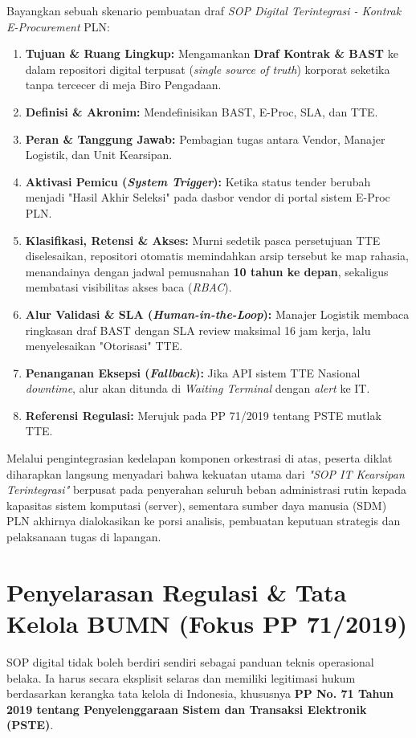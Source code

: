 \documentclass[12pt,a4paper]{report}
\begin{document}
Bayangkan sebuah skenario pembuatan draf \textit{SOP Digital Terintegrasi - Kontrak E-Procurement} PLN:

\begin{enumerate}[leftmargin=*]
    \item \textbf{Tujuan \& Ruang Lingkup:} Mengamankan \textbf{Draf Kontrak \& BAST} ke dalam repositori digital terpusat (\textit{single source of truth}) korporat seketika tanpa tercecer di meja Biro Pengadaan.
    \item \textbf{Definisi \& Akronim:} Mendefinisikan BAST, E-Proc, SLA, dan TTE.
    \item \textbf{Peran \& Tanggung Jawab:} Pembagian tugas antara Vendor, Manajer Logistik, dan Unit Kearsipan.
    \item \textbf{Aktivasi Pemicu (\textit{System Trigger}):} Ketika status tender berubah menjadi "Hasil Akhir Seleksi" pada dasbor vendor di portal sistem E-Proc PLN.
    \item \textbf{Klasifikasi, Retensi \& Akses:} Murni sedetik pasca persetujuan TTE diselesaikan, repositori otomatis memindahkan arsip tersebut ke map rahasia, menandainya dengan jadwal pemusnahan \textbf{10 tahun ke depan}, sekaligus membatasi visibilitas akses baca (\textit{RBAC}).
    \item \textbf{Alur Validasi \& SLA (\textit{Human-in-the-Loop}):} Manajer Logistik membaca ringkasan draf BAST dengan SLA review maksimal 16 jam kerja, lalu menyelesaikan "Otorisasi" TTE.
    \item \textbf{Penanganan Eksepsi (\textit{Fallback}):} Jika API sistem TTE Nasional \textit{downtime}, alur akan ditunda di \textit{Waiting Terminal} dengan \textit{alert} ke IT.
    \item \textbf{Referensi Regulasi:} Merujuk pada PP 71/2019 tentang PSTE mutlak TTE.
\end{enumerate}

Melalui pengintegrasian kedelapan komponen orkestrasi di atas, peserta diklat diharapkan langsung menyadari bahwa kekuatan utama dari \textit{"SOP IT Kearsipan Terintegrasi"} berpusat pada penyerahan seluruh beban administrasi rutin kepada kapasitas sistem komputasi (server), sementara sumber daya manusia (SDM) PLN akhirnya dialokasikan ke porsi analisis, pembuatan keputuan strategis dan pelaksanaan tugas di lapangan.

\section{Penyelarasan Regulasi \& Tata Kelola BUMN (Fokus PP 71/2019)}
SOP digital tidak boleh berdiri sendiri sebagai panduan teknis operasional belaka. Ia harus secara eksplisit selaras dan memiliki legitimasi hukum berdasarkan kerangka tata kelola di Indonesia, khususnya \textbf{PP No. 71 Tahun 2019 tentang Penyelenggaraan Sistem dan Transaksi Elektronik (PSTE)}.
\end{document}
